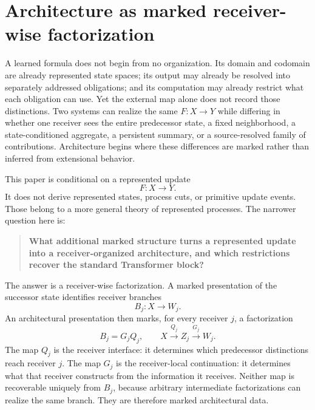 \section{Architecture as marked receiver-wise factorization}\label{sec:introduction}

A learned formula does not begin from no organization. Its domain and codomain are already represented state spaces; its output may already be resolved into separately addressed obligations; and its computation may already restrict what each obligation can use. Yet the external map alone does not record those distinctions. Two systems can realize the same $F:X\to Y$ while differing in whether one receiver sees the entire predecessor state, a fixed neighborhood, a state-conditioned aggregate, a persistent summary, or a source-resolved family of contributions. Architecture begins where these differences are marked rather than inferred from extensional behavior.

This paper is conditional on a represented update
\[
F:X\longrightarrow Y.
\]
It does not derive represented states, process cuts, or primitive update events. Those belong to a more general theory of represented processes. The narrower question here is:
\begin{quote}
\textbf{What additional marked structure turns a represented update into a receiver-organized architecture, and which restrictions recover the standard Transformer block?}
\end{quote}

The answer is a receiver-wise factorization. A marked presentation of the successor state identifies receiver branches
\[
B_j:X\to W_j.
\]
An architectural presentation then marks, for every receiver $j$, a factorization
\begin{equation}\label{eq:intro-central-factorization}
\boxed{
B_j
=
G_jQ_j,
\qquad
X\xrightarrow{Q_j}Z_j\xrightarrow{G_j}W_j.
}
\end{equation}
The map $Q_j$ is the receiver interface: it determines which predecessor distinctions reach receiver $j$. The map $G_j$ is the receiver-local continuation: it determines what that receiver constructs from the information it receives. Neither map is recoverable uniquely from $B_j$, because arbitrary intermediate factorizations can realize the same branch. They are therefore marked architectural data.

